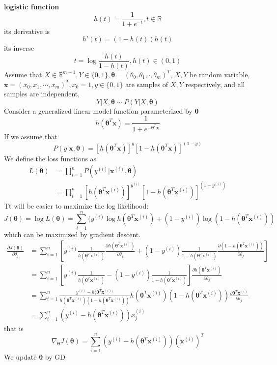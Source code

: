 \textbf{logistic function}
\[
	h (t)={\frac {1}{1+e^{-t}}}, t\in \mathbb{R}
\]
its derivative is
\[
	h'(t)= (1-h(t))h(t)
\]
its inverse
\[
	t = \log \frac{h(t)}{1-h(t)}, h(t) \in (0,1)
\]
Assume that $X\in\mathbb{R}^{m+1},Y\in\{0,1\},\boldsymbol \theta = (\theta_0,\theta_1,\cdot,\theta_m)^T$, $X,Y$ be random variable, $\boldsymbol x=(x_0,x_1,\cdots,x_m)^T, x_0=1, y \in \{0,1\}$ are samples of $X,Y$ respectively, and all samples are independent,  
\[
	Y|X,\boldsymbol \theta \sim P(Y| X,\boldsymbol\theta)
\]
Consider a generalized linear model function parameterized by $\boldsymbol\theta$
\[
	h(\boldsymbol\theta^T\boldsymbol x)=\frac {1}{1+e^{-\boldsymbol\theta^T \boldsymbol x}}
\]
If we assume that 
\[
	  P(y|\boldsymbol x,\boldsymbol\theta) = [h(\boldsymbol\theta^T\boldsymbol x)]^{y}[1-h(\boldsymbol\theta^T\boldsymbol x)]^{(1-y)}
\]
We define the loss functions as
\begin{align*}
	  L(\boldsymbol \theta) &= \prod_{i=1}^n  P(y^{(i)}|\boldsymbol x^{(i)} ,\boldsymbol\theta)\\
	  &= \prod _{i=1}^n [h(\boldsymbol\theta^T\boldsymbol x^{(i)} )]^{y^{(i)} }[1-h(\boldsymbol\theta^T\boldsymbol x^{(i)} )]^{(1-y^{(i)} )}
\end{align*}
Tt will be easier to maximize the log likelihood:
\[
	 J(\boldsymbol \theta) = \log L(\boldsymbol \theta) = \sum_{i=1}^n(y^{(i)} \log h(\boldsymbol\theta^T\boldsymbol x^{(i)} )  + (1-y^{(i)}) \log(1 - h(\boldsymbol\theta^T\boldsymbol x^{(i)}))  
\]
which can be maximized by gradient descent.
\begin{align*}
	 \frac{\partial J(\boldsymbol\theta)}{\partial\theta_j} 
	&=\sum_{i=1}^n [y^{(i)}\frac{1}{h(\boldsymbol \theta^T\boldsymbol x^{(i)})}\frac{\partial h(\boldsymbol \theta^T\boldsymbol x^{(i)})}{\partial \theta_j} + (1-y^{(i)})\frac{1}{1-h(\boldsymbol \theta^T\boldsymbol x^{(i)})}\frac{\partial (1-h(\boldsymbol \theta^T\boldsymbol x^{(i)}))}{\partial \theta_j} ]\\
	&=\sum_{i=1}^n [y^{(i)}\frac{1}{h(\boldsymbol \theta^T\boldsymbol x^{(i)})} - (1-y^{(i)})\frac{1}{1-h(\boldsymbol \theta^T\boldsymbol x^{(i)})}]\frac{\partial h(\boldsymbol \theta^T\boldsymbol x^{(i)})}{\partial \theta_j}\\
	&=\sum_{i=1}^n \frac{y^{(i)}-h(\boldsymbol \theta^T\boldsymbol x^{(i))}} {h(\boldsymbol \theta^T\boldsymbol x^{(i)})(1-h(\boldsymbol \theta^T\boldsymbol x^{(i)}))} h(\boldsymbol \theta^T\boldsymbol x^{(i)})(1-h(\boldsymbol \theta^T\boldsymbol x^{(i)})) \frac{\partial \boldsymbol \theta^T\boldsymbol x^{(i)}}{\partial \theta_j}\\
	&=\sum_{i=1}^n (y^{(i)}-h(\boldsymbol \theta^T\boldsymbol x^{(i)})) x_{j}^{(i)}
\end{align*}
that is
\[	
	\nabla _{\boldsymbol\theta} J(\boldsymbol\theta) = \sum_{i=1}^n (y^{(i)}-h(\boldsymbol \theta^T\boldsymbol x^{(i)})) (\boldsymbol x^{(i)})^T
\]
We update $\boldsymbol \theta$ by GD

